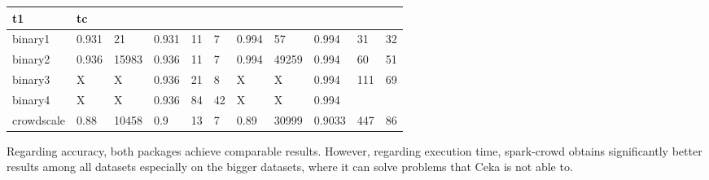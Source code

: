 \documentclass[letterpaper,10pt,english]{sphinxmanual}
\begin{document}
\begin{savenotes}
\begin{tabulary}{\linewidth}[t]{|T|T|T|T|T|T|T|T|T|T|T|}
t1
&\sphinxstyletheadfamily 
tc
\\
\hline
binary1
&
0.931
&
21
&
0.931
&
11
&
7
&
0.994
&
57
&
0.994
&
31
&
32
\\
\hline
binary2
&
0.936
&
15983
&
0.936
&
11
&
7
&
0.994
&
49259
&
0.994
&
60
&
51
\\
\hline
binary3
&
X
&
X
&
0.936
&
21
&
8
&
X
&
X
&
0.994
&
111
&
69
\\
\hline
binary4
&
X
&
X
&
0.936
&
84
&
42
&
X
&
X
&
0.994
&&\\
\hline
crowdscale
&
0.88
&
10458
&
0.9
&
13
&
7
&
0.89
&
30999
&
0.9033
&
447
&
86
\\
\hline
\end{tabulary}
\par
\sphinxattableend\end{savenotes}

Regarding accuracy, both packages achieve comparable results. However, regarding execution time, spark-crowd obtains
significantly better results among all datasets especially on the bigger datasets, where it can solve problems that
Ceka is not able to. 

%
%
\end{document}
